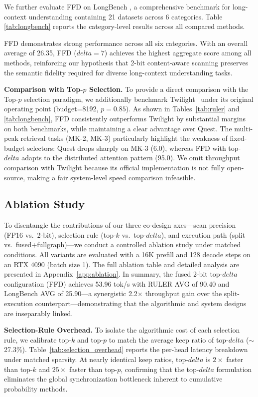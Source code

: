 \documentclass[]{mosi}
\def\delta{delta}%
\theoremstyle{plain}
\theoremstyle{definition}
\theoremstyle{remark}
\begin{document}
We further evaluate FFD on LongBench \citep{bai2024longbench}, a comprehensive benchmark for long-context understanding containing 21 datasets across 6 categories. Table \ref{tab:longbench} reports the category-level results across all compared methods.

FFD demonstrates strong performance across all six categories. With an overall average of 26.35, FFD ($\delta=7$) achieves the highest aggregate score among all methods, reinforcing our hypothesis that 2-bit content-aware scanning preserves the semantic fidelity required for diverse long-context understanding tasks.

\textbf{Comparison with Top-$p$ Selection.} To provide a direct comparison with the Top-$p$ selection paradigm, we additionally benchmark Twilight~\citep{lin2025twilight} under its original operating point (budget=8192, $p=0.85$). As shown in Tables~\ref{tab:ruler} and \ref{tab:longbench}, FFD consistently outperforms Twilight by substantial margins on both benchmarks, while maintaining a clear advantage over Quest. The multi-peak retrieval tasks (MK-2, MK-3) particularly highlight the weakness of fixed-budget selectors: Quest drops sharply on MK-3 (6.0), whereas FFD with top-$\delta$ adapts to the distributed attention pattern (95.0). We omit throughput comparison with Twilight because its official implementation is not fully open-source, making a fair system-level speed comparison infeasible.

\subsection{Ablation Study}
\label{sec:ablation}

To disentangle the contributions of our three co-design axes---scan precision (FP16 vs.\ 2-bit), selection rule (top-$k$ vs.\ top-$\delta$), and execution path (split vs.\ fused+fullgraph)---we conduct a controlled ablation study under matched conditions. All variants are evaluated with a 16K prefill and 128 decode steps on an RTX 4090 (batch size 1). The full ablation table and detailed analysis are presented in Appendix~\ref{app:ablation}. In summary, the fused 2-bit top-$\delta$ configuration (FFD) achieves 53.96 tok/s with RULER AVG of 90.40 and LongBench AVG of 25.90---a synergistic 2.2$\times$ throughput gain over the split-execution counterpart---demonstrating that the algorithmic and system designs are inseparably linked.

\textbf{Selection-Rule Overhead.} To isolate the algorithmic cost of each selection rule, we calibrate top-$k$ and top-$p$ to match the average keep ratio of top-$\delta$ ($\sim$27.3\%). Table~\ref{tab:selection_overhead} reports the per-head latency breakdown under matched sparsity. At nearly identical keep ratios, top-$\delta$ is $2\times$ faster than top-$k$ and $25\times$ faster than top-$p$, confirming that the top-$\delta$ formulation eliminates the global synchronization bottleneck inherent to cumulative probability methods.
\end{document}
